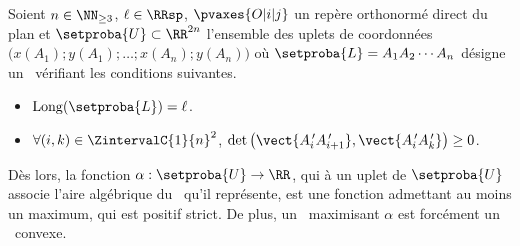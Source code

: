 \begin{fact} \label{at-least-one-ncycle}
    Soient $n \in \NN_{\geq3}$,
    $\ell \in \RRsp$,
    $\pvaxes{O | i | j}$ un repère orthonormé direct du plan
    et
    $\setproba{U} \subset \RR^{2n}$ l'ensemble des uplets de coordonnées $\big( x(A_1) ; y(A_1) ; \dots ; x(A_n) ; y(A_n) \big)$ où $\setproba{L} = A_1 A_2 \cdots A_n$ désigne un \ncycle\ vérifiant les conditions suivantes.
    \begin{itemize}
        \item $\cyclelen{\setproba{L}} = \ell$.
    
        \item $\forall (i, k) \in \ZintervalC{1}{n}^2$,
		$\det \big( \vect{\primeit{A}_i \primeit{A}_{i+1}}, \vect{\primeit{A}_i \primeit{A}_k} \big) \geq 0$.
    \end{itemize}
    
    Dès lors, la fonction $\alpha: \setproba{U} \rightarrow \RR$, qui à un uplet de $\setproba{U}$ associe l'aire algébrique du \ncycle\ qu'il représente, est une fonction admettant au moins un maximum, qui est positif strict.
    De plus, un \ncycle\ maximisant $\alpha$ est forcément un \ngone\ convexe.
\end{fact}


